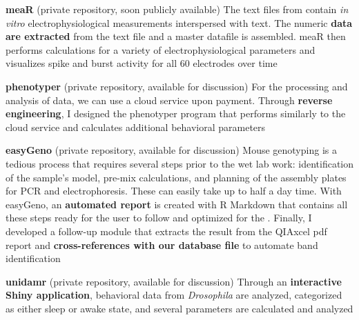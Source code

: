 \documentclass[
  a4paper, 
   maincolor=cvblue,
   sectioncolor=cvblue,
]{fortysecondscv}
\begin{document}
\textbf{meaR} (private repository, soon publicly available) \newline
The text files from \href{https://www.multichannelsystems.com/products/vitro-mea-systems}{\color{blue}{Micro-Electrode Arrays}} contain \emph{in vitro} electrophysiological measurements interspersed with text.  The numeric \textbf{data are extracted} from the text file and a master datafile is assembled. meaR then performs calculations for a variety of electrophysiological parameters and visualizes spike and burst activity for all 60 electrodes over time \newline

\textbf{phenotyper} (private repository, available for discussion) \newline
For the processing and analysis of \href{https://www.sylics.com/bioinformatics/cognitionwall/}{\color{blue}{Phenotyper}} data, we can use a cloud service upon payment. Through \textbf{reverse engineering}, I designed the phenotyper program that performs similarly to the cloud service and calculates additional behavioral parameters \newline

\textbf{easyGeno} (private repository, available for discussion) \newline
Mouse genotyping is a tedious process that requires several steps prior to the wet lab work:  identification of the sample's model, pre-mix calculations, and planning of the assembly plates for PCR and electrophoresis. These can easily take up to half a day time. With easyGeno, an \textbf{automated report} is created with R Markdown that contains all these steps ready for the user to follow and optimized for the \href{https://www.qiagen.com/us/service-and-support/learning-hub/technologies-and-research-topics/sample-quality-control/instruments/qiaxcel-advanced/}{\color{blue}{QIAxcel apparatus}}. Finally, I developed a follow-up module that extracts the result from the QIAxcel pdf report and \textbf{cross-references with our database file} to automate band identification \newline

\textbf{unidamr} (private repository, available for discussion) \newline
Through an \textbf{interactive Shiny application}, behavioral data from \emph{Drosophila} are analyzed, categorized as either sleep or awake state, and several parameters are calculated and analyzed

\newpage
\makebacksidebar
\end{document}

